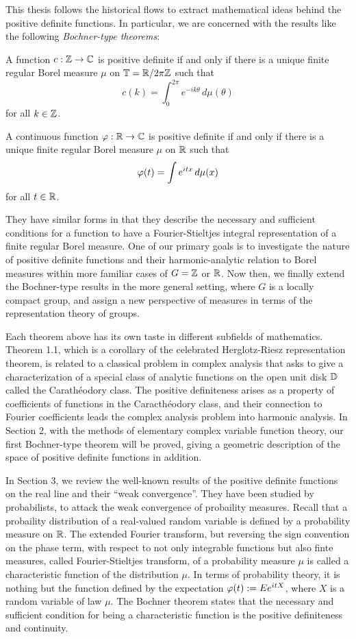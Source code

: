 \documentclass[12pt]{article}
\begin{document}
This thesis follows the historical flows to extract mathematical ideas behind the positive definite functions.
In particular, we are concerned with the results like the following \emph{Bochner-type theorems}:
\begin{thm}
A function $c:\mathbb{Z}\to\mathbb{C}$ is positive definite if and only if there is a unique finite regular Borel measure $\mu$ on $\mathbb{T}=\mathbb{R}/2\pi\mathbb{Z}$ such that
\[c(k)=\int_0^{2\pi}e^{-ik\theta}\,d\mu(\theta)\]
for all $k\in\mathbb{Z}$.
\end{thm}
\begin{thm}
A continuous function $\varphi:\mathbb{R}\to\mathbb{C}$ is positive definite if and only if there is a unique finite regular Borel measure $\mu$ on $\mathbb{R}$ such that
\[\varphi(t)=\int e^{itx}\,d\mu(x)\]
for all $t\in\mathbb{R}$.
\end{thm}
They have similar forms in that they describe the necessary and sufficient conditions for a function to have a Fourier-Stieltjes integral representation of a finite regular Borel measure.
One of our primary goals is to investigate the nature of positive definite functions and their harmonic-analytic relation to Borel measures within more familiar cases of $G=\mathbb{Z}$ or $\mathbb{R}$.
Now then, we finally extend the Bochner-type results in the more general setting, where $G$ is a locally compact group, and assign a new perspective of measures in terms of the representation theory of groups.

Each theorem above has its own taste in different subfields of mathematics.
Theorem 1.1, which is a corollary of the celebrated Herglotz-Riesz representation theorem, is related to a classical problem in complex analysis that asks to give a characterization of a special class of analytic functions on the open unit disk $\mathbb{D}$ called the Carath\'eodory class.
The positive definiteness arises as a property of coefficients of functions in the Caracth\'eodory class, and their connection to Fourier coefficients leads the complex analysis problem into harmonic analysis.
In Section 2, with the methods of elementary complex variable function theory, our first Bochner-type theorem will be proved, giving a geometric description of the space of positive definite functions in addition.

In Section 3, we review the well-known results of the positive definite functions on the real line and their ``weak convergence''.
They have been studied by probabilists, to attack the weak convergence of probaility measures.
Recall that a probaility distribution of a real-valued random variable is defined by a probability measure on $\mathbb{R}$.
The extended Fourier transform, but reversing the sign convention on the phase term, with respect to not only integrable functions but also finte measures, called Fourier-Stieltjes transform, of a probability measure $\mu$ is called a characteristic function of the distribution $\mu$.
In terms of probability theory, it is nothing but the function defined by the expectation $\varphi(t):=Ee^{itX}$, where $X$ is a random variable of law $\mu$.
The Bochner theorem states that the necessary and sufficient condition for being a characteristic function is the positive definiteness and continuity.
\end{document}
